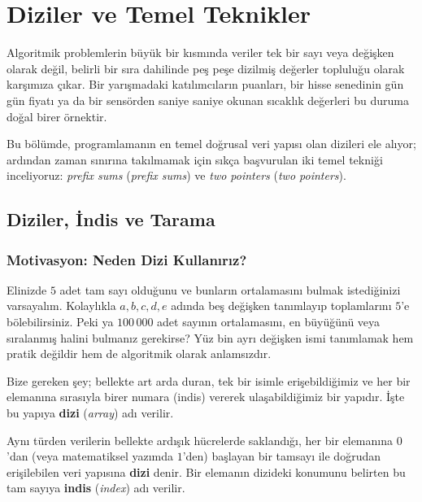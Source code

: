\chapter[Diziler ve Temel Teknikler · \textit{Temel}]{Diziler ve Temel Teknikler}

Algoritmik problemlerin büyük bir kısmında veriler tek bir sayı veya değişken olarak değil, belirli bir sıra dahilinde peş peşe dizilmiş değerler topluluğu olarak karşımıza çıkar. Bir yarışmadaki katılımcıların puanları, bir hisse senedinin gün gün fiyatı ya da bir sensörden saniye saniye okunan sıcaklık değerleri bu duruma doğal birer örnektir. 

Bu bölümde, programlamanın en temel doğrusal veri yapısı olan dizileri ele alıyor; ardından zaman sınırına takılmamak için sıkça başvurulan iki temel tekniği inceliyoruz: \emph{prefix sums} (\emph{prefix sums}) ve \emph{two pointers} (\emph{two pointers}).

\section{Diziler, İndis ve Tarama}

\subsection{Motivasyon: Neden Dizi Kullanırız?}
Elinizde $5$ adet tam sayı olduğunu ve bunların ortalamasını bulmak istediğinizi varsayalım. Kolaylıkla $a, b, c, d, e$ adında beş değişken tanımlayıp toplamlarını $5$'e bölebilirsiniz. Peki ya $100\,000$ adet sayının ortalamasını, en büyüğünü veya sıralanmış halini bulmanız gerekirse? Yüz bin ayrı değişken ismi tanımlamak hem pratik değildir hem de algoritmik olarak anlamsızdır.

Bize gereken şey; bellekte art arda duran, tek bir isimle erişebildiğimiz ve her bir elemanına sırasıyla birer numara (indis) vererek ulaşabildiğimiz bir yapıdır. İşte bu yapıya \textbf{dizi} (\emph{array}) adı verilir.

\begin{definition}
Aynı türden verilerin bellekte ardışık hücrelerde saklandığı, her bir elemanına $0$'dan (veya matematiksel yazımda $1$'den) başlayan bir tamsayı ile doğrudan erişilebilen veri yapısına \textbf{dizi} denir. Bir elemanın dizideki konumunu belirten bu tam sayıya \textbf{indis} (\emph{index}) adı verilir.
\end{definition}

